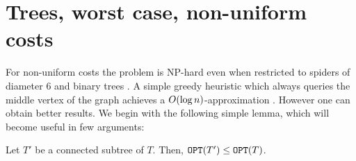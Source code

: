 \newpage
\section{Trees, worst case, non-uniform costs}

For non-uniform costs the problem is NP-hard even when restricted to spiders of diameter $6$ and binary trees \cite{Cicalese2012BinIdentPForWTs,Cicalese2016OnTSPwNonUniCost}.
A simple greedy heuristic which always queries the middle vertex of the graph achieves a $O\mathopen{}\left( \log n \right)$-approximation \cite{Dereniowski2009ERankOfWTs}. However one can obtain better results. 
We begin with the following simple lemma, which will become useful in few arguments:
\begin{lemma}\label{lemma:subtreeCost}
    Let $T'$ be a connected subtree of $T$. Then, $\texttt{OPT}\mathopen{}\left( T' \right)\leq\texttt{OPT}\mathopen{}\left( T \right)$.
\end{lemma}






